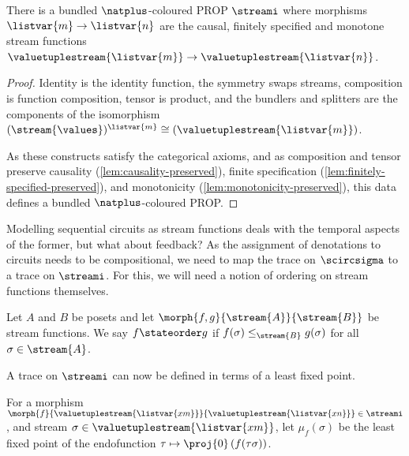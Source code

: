 \begin{proposition}
    There is a bundled \(\natplus\)-coloured PROP \(\streami\) where morphisms
    \(\listvar{m} \to \listvar{n}\) are the causal, finitely specified and
    monotone stream functions \(
        \valuetuplestream{\listvar{m}} \to \valuetuplestream{\listvar{n}}
    \).
\end{proposition}
\begin{proof}
    Identity is the identity function, the symmetry swaps streams, composition
    is function composition, tensor is product, and the bundlers and splitters
    are the components of the isomorphism \(
        (\stream{\values})^{\listvar{m}}
        \cong
        (\valuetuplestream{\listvar{m}})
    \).

    As these constructs satisfy the categorical axioms, and as composition and
    tensor preserve causality (\cref{lem:causality-preserved}),
    finite specification (\cref{lem:finitely-specified-preserved}),
    and monotonicity (\cref{lem:monotonicity-preserved}), this data defines a
    bundled \(\natplus\)-coloured PROP.
\end{proof}

Modelling sequential circuits as stream functions deals with the temporal
aspects of the former, but what about feedback?
As the assignment of denotations to circuits needs to be compositional, we need
to map the trace on \(\scircsigma\) to a trace on \(\streami\).
For this, we will need a notion of ordering on stream functions themselves.

\begin{definition}\label{def:state-order}
    Let \(A\) and \(B\) be posets and let
    \(\morph{f, g}{\stream{A}}{\stream{B}}\) be stream functions.
    We say \(f \stateorder g\) if \(f(\sigma) \leq_{\stream{B}} g(\sigma)\)
    for all \(\sigma \in \stream{A}\).
\end{definition}

A trace on \(\streami\) can now be defined in terms of a least fixed point.

\begin{notation}
    For a morphism \(
        \morph{f}{\valuetuplestream{\listvar{xm}}}{\valuetuplestream{\listvar{xn}}}
        \in \streami
    \), and stream \(\sigma \in \valuetuplestream{\listvar{xm}}\), let
    \(\mu_f(\sigma)\) be the least fixed point of the endofunction \(
        \tau \mapsto \proj{0}\left(f(\tau\sigma)\right)
    \).
\end{notation}

